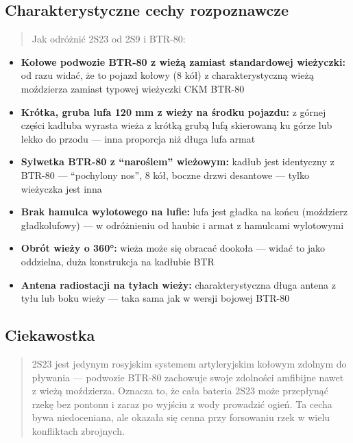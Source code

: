 \documentclass[12pt,oneside]{book}
\providecommand{\tightlist}{%
  \setlength{\itemsep}{0pt}\setlength{\parskip}{0pt}}
\begin{document}
\subsection{Charakterystyczne cechy
rozpoznawcze}\label{charakterystyczne-cechy-rozpoznawcze-23}

\begin{quote}
Jak odróżnić 2S23 od 2S9 i BTR-80:
\end{quote}

\begin{itemize}
\tightlist
\item
  \textbf{Kołowe podwozie BTR-80 z wieżą zamiast standardowej
  wieżyczki:} od razu widać, że to pojazd kołowy (8 kół) z
  charakterystyczną wieżą moździerza zamiast typowej wieżyczki CKM
  BTR-80
\item
  \textbf{Krótka, gruba lufa 120 mm z wieży na środku pojazdu:} z górnej
  części kadłuba wyrasta wieża z krótką grubą lufą skierowaną ku górze
  lub lekko do przodu --- inna proporcja niż długa lufa armat
\item
  \textbf{Sylwetka BTR-80 z ``naroślem'' wieżowym:} kadłub jest
  identyczny z BTR-80 --- ``pochylony nos'', 8 kół, boczne drzwi
  desantowe --- tylko wieżyczka jest inna
\item
  \textbf{Brak hamulca wylotowego na lufie:} lufa jest gładka na końcu
  (moździerz gładkolufowy) --- w odróżnieniu od haubic i armat z
  hamulcami wylotowymi
\item
  \textbf{Obrót wieży o 360°:} wieża może się obracać dookoła --- widać
  to jako oddzielna, duża konstrukcja na kadłubie BTR
\item
  \textbf{Antena radiostacji na tyłach wieży:} charakterystyczna długa
  antena z tyłu lub boku wieży --- taka sama jak w wersji bojowej BTR-80
\end{itemize}

\subsection{Ciekawostka}\label{ciekawostka-23}

\begin{quote}
2S23 jest jedynym rosyjskim systemem artyleryjskim kołowym zdolnym do
pływania --- podwozie BTR-80 zachowuje swoje zdolności amfibijne nawet z
wieżą moździerza. Oznacza to, że cała bateria 2S23 może przepłynąć rzekę
bez pontonu i zaraz po wyjściu z wody prowadzić ogień. Ta cecha bywa
niedoceniana, ale okazała się cenna przy forsowaniu rzek w wielu
konfliktach zbrojnych.
\end{quote}
\end{document}
